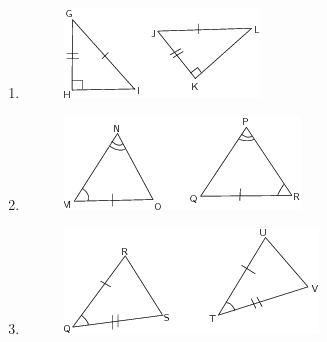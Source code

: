 \begin{enumerate}[noitemsep, label=\textbf{\arabic*}. ]
\begin{enumerate}[noitemsep, label=\textbf{\alph*}. ]
\begin{figure}[H]
\begin{center}
      \vspace{2pt}
    \vspace{.1in}
    \end{center}
 \end{figure}       \label{m39368*uid128}\item 
    \setcounter{subfigure}{0}
	\begin{figure}[H] %
    \begin{center}
    \label{m39368*id320530!!!underscore!!!media}\label{m39368*id320530!!!underscore!!!printimage}\includegraphics{col11306.imgs/m39368_MG10C13_061.png} %
      \vspace{2pt}
    \vspace{.1in}
    \end{center}
 \end{figure}       \label{m39368*uid129}\item 
    \setcounter{subfigure}{0}
	\begin{figure}[H] %
    \begin{center}
    \label{m39368*id320548!!!underscore!!!media}\label{m39368*id320548!!!underscore!!!printimage}\includegraphics{col11306.imgs/m39368_MG10C13_062.png} %
      \vspace{2pt}
    \vspace{.1in}
    \end{center}
 \end{figure}       \label{m39368*uid130}\item 
    \setcounter{subfigure}{0}
	\begin{figure}[H] %
    \begin{center}
    \label{m39368*id320565!!!underscore!!!media}\label{m39368*id320565!!!underscore!!!printimage}\includegraphics{col11306.imgs/m39368_MG10C13_063.png} %

\end{center}
\end{figure}
\end{enumerate}
\end{enumerate}
